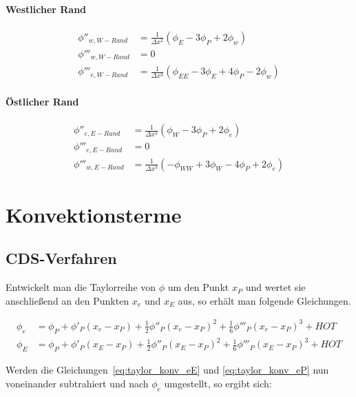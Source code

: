 \documentclass[10pt, ngerman,colorback,accentcolor=tud2d]{tudreport}
\begin{document}
\paragraph{Westlicher Rand}

\begin{align}
  \phi''_{w, W-Rand} &= \frac{1}{\Delta x^2} (\phi_E-3\phi_P+2\phi_w)\\
  \phi'''_{w, W-Rand} &= 0\\
  \phi'''_{e, W-Rand} &= \frac{1}{\Delta x^3} (\phi_{EE} -3\phi_E + 4\phi_P -2\phi_w)
\end{align}

\paragraph{Östlicher Rand}

\begin{align}
  \phi''_{e, E-Rand} &= \frac{1}{\Delta x^2} (\phi_W-3\phi_P+2\phi_e)\\
  \phi'''_{e, E-Rand} &= 0\\
  \phi'''_{w, E-Rand} &= \frac{1}{\Delta x^3} (-\phi_{WW} +3\phi_W - 4\phi_P +2\phi_e)
\end{align}



\section{Konvektionsterme}

\subsection{CDS-Verfahren}
Entwickelt man die Taylorreihe von $\phi$ um den Punkt $x_P$ und wertet sie anschließend
an den Punkten $x_e$ und $x_E$ aus, so erhält man folgende Gleichungen.

\begin{align}
  \phi_e &= \phi_P + \phi'_P(x_e-x_P)+\frac{1}{2}\phi''_P(x_e-x_P)^2
  +\frac{1}{6}\phi'''_P(x_e-x_P)^3+HOT
  \label{eq:taylor_konv_eP}\\
  \phi_E &= \phi_P + \phi'_P(x_E-x_P)+\frac{1}{2}\phi''_P(x_E-x_P)^2
  +\frac{1}{6}\phi'''_P(x_E-x_P)^3+HOT
  \label{eq:taylor_konv_eE}
\end{align}

Werden die Gleichungen~\eqref{eq:taylor_konv_eE} und \eqref{eq:taylor_konv_eP} nun
voneinander subtrahiert und nach $\phi_e$ umgestellt, so ergibt sich:
\end{document}
